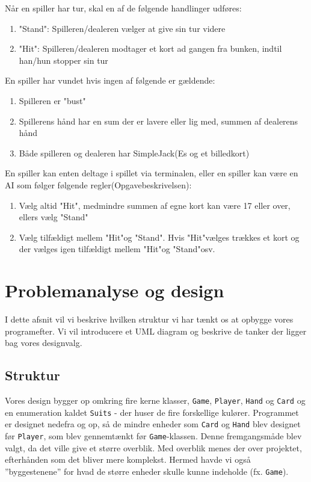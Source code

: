 \documentclass[a4paper]{article}
\begin{document}
    Når en spiller har tur, skal en af de følgende handlinger udføres:
    \begin{enumerate}
      \item "Stand": Spilleren/dealeren vælger at give sin tur videre
      \item "Hit": Spilleren/dealeren modtager et kort ad gangen fra bunken,
      indtil han/hun stopper sin tur
    \end{enumerate}

    En spiller har vundet hvis ingen af følgende er gældende:
    \begin{enumerate}
      \item Spilleren er "bust"
      \item Spillerens hånd har en sum der er lavere eller lig med,
      summen af dealerens hånd
      \item Både spilleren og dealeren har SimpleJack(Es og et billedkort)
    \end{enumerate}

    En spiller kan enten deltage i spillet via terminalen,
    eller en spiller kan være en AI som følger følgende regler(Opgavebeskrivelsen):
    \begin{enumerate}
      \item Vælg altid "Hit", medmindre summen af egne kort kan være 17 eller over, ellers vælg "Stand"
      \item Vælg tilfældigt mellem "Hit"og "Stand". Hvis "Hit"vælges trækkes et kort og der vælges igen tilfældigt mellem "Hit"og "Stand"osv.
    \end{enumerate}

  \section{Problemanalyse og design} \label{sec:design}
    I dette afsnit vil vi beskrive hvilken struktur vi har tænkt os at opbygge vores programefter.
    Vi vil introducere et UML diagram og beskrive de tanker der ligger bag vores designvalg.

    \subsection*{Struktur}
      Vores design bygger op omkring fire kerne klasser,
      \texttt{Game}, \texttt{\texttt{Player}}, \texttt{\texttt{Hand}} og \texttt{\texttt{Card}} og en enumeration kaldet \texttt{\texttt{Suits}} - der huser de fire forskellige kulører.
      Programmet er designet nedefra og op, så de mindre enheder som \texttt{\texttt{Card}} og \texttt{\texttt{Hand}} blev designet før \texttt{\texttt{Player}}, som blev gennemtænkt før \texttt{Game}-klassen. 
      Denne fremgangsmåde blev valgt, da det ville give et større overblik. Med overblik menes der over projektet, efterhånden som det bliver mere komplekst. Hermed havde vi også ”byggestenene” for hvad de større enheder skulle kunne indeholde (fx. \texttt{Game}).
\end{document}

